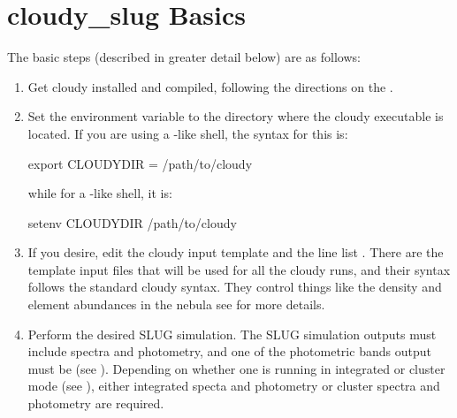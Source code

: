 \documentclass[letterpaper,10pt,english]{sphinxmanual}
\begin{document}
\section{cloudy\_slug Basics}
\label{\detokenize{cloudy:cloudy-slug-basics}}
The basic steps (described in greater detail below) are as follows:
\begin{enumerate}
\item {} 
Get cloudy installed and compiled, following the directions on the
.

\item {} 
Set the environment variable  to the directory where
the cloudy executable  is located.  If you are using
a -like shell, the syntax for this is:

\begin{sphinxVerbatim}[commandchars=\\\{\}]
export CLOUDY\PYGZus{}DIR = /path/to/cloudy
\end{sphinxVerbatim}

while for a -like shell, it is:

\begin{sphinxVerbatim}[commandchars=\\\{\}]
setenv CLOUDY\PYGZus{}DIR /path/to/cloudy
\end{sphinxVerbatim}

\item {} 
If you desire, edit the cloudy input template
 and the line list
. There are the template input files
that will be used for all the cloudy runs, and their syntax follows
the standard cloudy syntax. They control things like the density and
element abundances in the nebula \textendash{} see {\hyperref[\detokenize{cloudy:ssec-cloudy-template}]{}}
for more details.

\item {} 
Perform the desired SLUG simulation. The SLUG simulation outputs
must include spectra and photometry, and one of the photometric
bands output must be  (see
{\hyperref[\detokenize{parameters:ssec-phot-keywords}]{}}). Depending on whether one is running in
integrated or cluster mode (see
{\hyperref[\detokenize{cloudy:sssec-cloudy-integrated-cluster}]{}}), either integrated specta
and photometry or cluster spectra and photometry are
required.


\end{enumerate}
\end{document}
